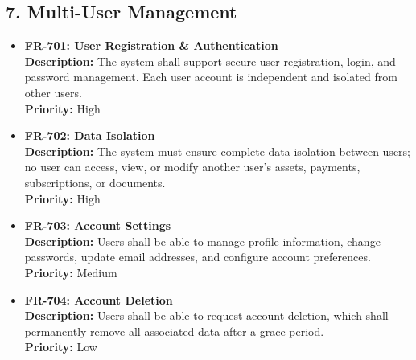 \documentclass[11pt, a4paper]{article}
\newcommand{\reqid}[1]{\textbf{\color{PrimaryColor}#1}}
\begin{document}
	\subsection{7. Multi-User Management}
	\begin{itemize}
		\item \reqid{FR-701: User Registration \& Authentication} \\
		\textbf{Description:} The system shall support secure user registration, login, and password management. Each user account is independent and isolated from other users. \\
		\textbf{Priority:} High
		
		\item \reqid{FR-702: Data Isolation} \\
		\textbf{Description:} The system must ensure complete data isolation between users; no user can access, view, or modify another user's assets, payments, subscriptions, or documents. \\
		\textbf{Priority:} High
		
		\item \reqid{FR-703: Account Settings} \\
		\textbf{Description:} Users shall be able to manage profile information, change passwords, update email addresses, and configure account preferences. \\
		\textbf{Priority:} Medium
		
		\item \reqid{FR-704: Account Deletion} \\
		\textbf{Description:} Users shall be able to request account deletion, which shall permanently remove all associated data after a grace period. \\
		\textbf{Priority:} Low
	\end{itemize}
	
\end{document}
